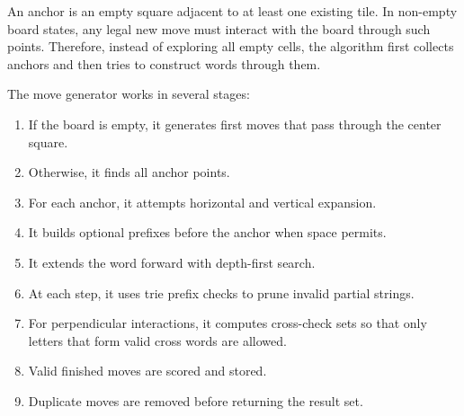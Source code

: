 \documentclass[conference]{IEEEtran}
\begin{document}
An anchor is an empty square adjacent to at least one existing tile. In non-empty board states, any legal new move must interact with the board through such points. Therefore, instead of exploring all empty cells, the algorithm first collects anchors and then tries to construct words through them.

The move generator works in several stages:
\begin{enumerate}
\item If the board is empty, it generates first moves that pass through the center square.
\item Otherwise, it finds all anchor points.
\item For each anchor, it attempts horizontal and vertical expansion.
\item It builds optional prefixes before the anchor when space permits.
\item It extends the word forward with depth-first search.
\item At each step, it uses trie prefix checks to prune invalid partial strings.
\item For perpendicular interactions, it computes cross-check sets so that only letters that form valid cross words are allowed.
\item Valid finished moves are scored and stored.
\item Duplicate moves are removed before returning the result set.
\end{enumerate}
\end{document}
